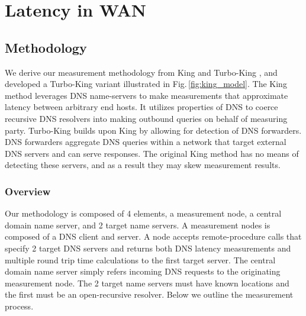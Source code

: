 \section{Latency in WAN}
\label{sec:latency-wan}

\subsection{Methodology}
\label{sec:methodology}


We derive our measurement methodology from King \cite{gummadi2002king} and Turbo-King \cite{leonard2008turbo}, and developed a Turbo-King variant illustrated in Fig.\,\ref{fig:king_model}. The King method leverages DNS name-servers to make measurements that approximate latency between arbitrary end hosts. It utilizes properties of DNS to coerce recursive DNS resolvers into making outbound queries on behalf of measuring party. Turbo-King builds upon King by allowing for detection of DNS forwarders. DNS forwarders aggregate DNS queries within a network that target external DNS servers and can serve responses. The original King method has no means of detecting these servers, and as a result they may skew measurement results.

\subsubsection{Overview}
Our methodology is composed of 4 elements, a measurement node, a central domain name server, and 2 target name servers. A measurement nodes is composed of a DNS client and server. A node accepts remote-procedure calls that specify 2 target DNS servers and returns both DNS latency measurements and multiple round trip time calculations to the first target server. The central domain name server simply refers incoming DNS requests to the originating measurement node. The 2 target name servers must have known locations and the first must be an open-recursive resolver. Below we outline the measurement process.

